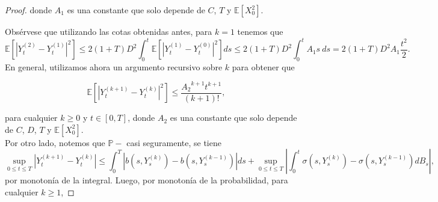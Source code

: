 \documentclass[letterpaper]{article}
\newcommand{\abs}[1]{\left\lvert #1 \right\rvert}
\newcommand{\E}{\mathbb{E}}
\renewcommand{\P}{\mathbb{P}}
\newcommand{\1}{\mathds{1}}
\theoremstyle{definition}
\theoremstyle{definition}
\theoremstyle{definition}
\theoremstyle{definition}
\theoremstyle{definition}
\begin{document}
\begin{enumerate}
\begin{proof}
        donde $A_1$ es una constante que solo depende de $C$, $T$ y $\E\left[X_0^2\right]$.

        Obsérvese que utilizando las cotas obtenidas antes, para $k=1$ tenemos que 
        \[
        \E\left[|Y_t^{(2)}-Y_t^{(1)}|^2\right]\leq 2(1+T)D^2\int_{0}^{t}\E\left[\abs{Y_t^{(1)}-Y_t^{(0)}}^2\right]ds\leq 2(1+T)D^2\int_{0}^{t}A_1s \ ds=2(1+T)D^2A_1\frac{t^2}{2}.
        \] 
        En general, utilizamos ahora un argumento recursivo sobre $k$ para obtener que 
        
        \begin{equation}\label{eq5}
            \E\left[|Y_t^{(k+1)}-Y_t^{(k)}|^2\right]\leq \frac{{A_2}^{k+1}t^{k+1}}{(k+1)!},
        \end{equation}
        
        para cualquier $k\geq0$ y $t\in [0,T]$, donde $A_2$ es una constante 
        que solo depende de $C$, $D$, $T$ y $\E\left[X_0^2\right]$.\\

        Por otro lado, notemos que $\P-$ casi seguramente, se tiene
        \[
            \sup_{0\leq t\leq T} |Y^{(k+1)}_t-Y^{(k)}_t|\leq \int_{0}^{T}|b(s,Y_s^{(k)})-b(s,Y_s^{(k-1)})|ds+\sup_{0\leq t\leq T}\abs{\int_{0}^{t}\sigma(s,Y_s^{(k)})-\sigma(s,Y_s^{(k-1)})dB_s}, 
        \]
        por monotonía de la integral. Luego, por monotonía 
        de la probabilidad, para cualquier $k\geq1$,
        

\end{proof}
\end{enumerate}
\end{document}

